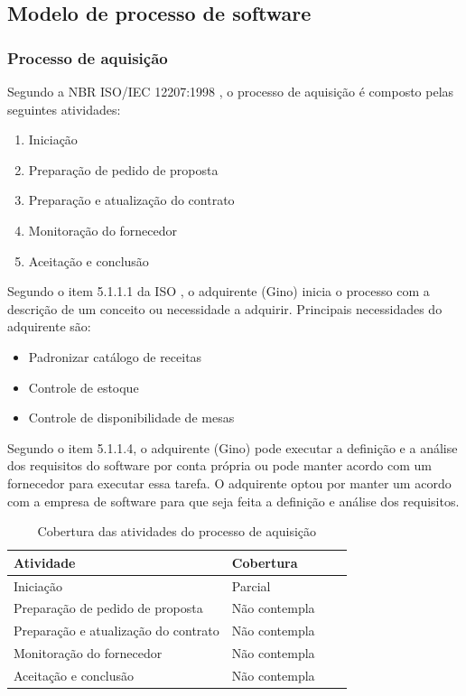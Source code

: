 \subsection{Modelo de processo de software}

\subsubsection{\large{Processo de aquisição}}

Segundo a NBR ISO/IEC 12207:1998 \cite{iso12207:95}, o processo de aquisição é composto pelas seguintes atividades:

\begin{enumerate}
  \item Iniciação
  \item Preparação de pedido de proposta
  \item Preparação e atualização do contrato
  \item Monitoração do fornecedor
  \item Aceitação e conclusão
\end{enumerate}

Segundo o item 5.1.1.1 da ISO \cite{iso12207:95}, o adquirente (Gino) inicia o processo com a
descrição de um conceito ou necessidade a adquirir. Principais necessidades do adquirente são:

\begin{itemize}
  \item Padronizar catálogo de receitas
  \item Controle de estoque
  \item Controle de disponibilidade de mesas
\end{itemize}

Segundo o item 5.1.1.4, o adquirente (Gino) pode executar a definição e a análise dos requisitos do software por conta própria ou pode manter acordo com um fornecedor para executar essa tarefa. O adquirente optou por manter um acordo com a empresa de software para que seja feita a definição e análise dos requisitos. 

\begin{table}[htb]
      \begin{center}
        \begin{tabular}{| l | l | l | l |}
        \hline
        \textbf{Atividade} & \textbf{Cobertura} \\ \hline
        Iniciação & Parcial \\ \hline
        Preparação de pedido de proposta & Não contempla \\ \hline
        Preparação e atualização do contrato & Não contempla \\ \hline
        Monitoração do fornecedor & Não contempla \\ \hline
        Aceitação e conclusão & Não contempla \\ \hline
        \end{tabular}
      \end{center}
    \caption{Cobertura das atividades do processo de aquisição}
    \end{table}



